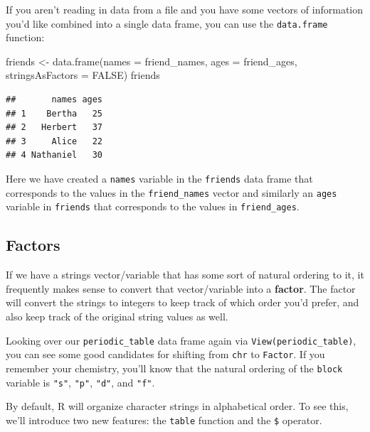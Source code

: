 \documentclass[]{tufte-book}
\newenvironment{Shaded}{\begin{snugshade}}{\end{snugshade}}
\newcommand{\AttributeTok}[1]{\textcolor[rgb]{0.77,0.63,0.00}{#1}}
\newcommand{\ConstantTok}[1]{\textcolor[rgb]{0.00,0.00,0.00}{#1}}
\newcommand{\FunctionTok}[1]{\textcolor[rgb]{0.00,0.00,0.00}{#1}}
\newcommand{\NormalTok}[1]{#1}
\newcommand{\OtherTok}[1]{\textcolor[rgb]{0.56,0.35,0.01}{#1}}
\newcommand{\SpecialCharTok}[1]{\textcolor[rgb]{0.00,0.00,0.00}{#1}}
\begin{document}
If you aren't reading in data from a file and you have some vectors of information you'd like combined into a single data frame, you can use the \texttt{data.frame} function:

\begin{Shaded}
\begin{Highlighting}[]
\NormalTok{friends }\OtherTok{\textless{}{-}} \FunctionTok{data.frame}\NormalTok{(}\AttributeTok{names =}\NormalTok{ friend\_names,}
           \AttributeTok{ages =}\NormalTok{ friend\_ages,}
           \AttributeTok{stringsAsFactors =} \ConstantTok{FALSE}\NormalTok{)}
\NormalTok{friends}
\end{Highlighting}
\end{Shaded}

\begin{verbatim}
##       names ages
## 1    Bertha   25
## 2   Herbert   37
## 3     Alice   22
## 4 Nathaniel   30
\end{verbatim}

Here we have created a \texttt{names} variable in the \texttt{friends} data frame that corresponds to the values in the \texttt{friend\_names} vector and similarly an \texttt{ages} variable in \texttt{friends} that corresponds to the values in \texttt{friend\_ages}.

\hypertarget{factors}{%
\subsection{Factors}\label{factors}}

If we have a strings vector/variable that has some sort of natural ordering to it, it frequently makes sense to convert that vector/variable into a \textbf{factor}. The factor will convert the strings to integers to keep track of which order you'd prefer, and also keep track of the original string values as well.

Looking over our \texttt{periodic\_table} data frame again via \texttt{View(periodic\_table)}, you can see some good candidates for shifting from \texttt{chr} to \texttt{Factor}. If you remember your chemistry, you'll know that the natural ordering of the \texttt{block} variable is \texttt{"s"}, \texttt{"p"}, \texttt{"d"}, and \texttt{"f"}.

By default, R will organize character strings in alphabetical order. To see this, we'll introduce two new features: the \texttt{table} function and the \texttt{\$} operator.

\begin{Shaded}
\end{Shaded}
\end{document}
